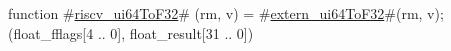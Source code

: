 function #\hyperref[sailRISCVzriscvzyui64ToF32]{riscv\_ui64ToF32}# (rm, v) = {
  #\hyperref[sailRISCVzexternzyui64ToF32]{extern\_ui64ToF32}#(rm, v);
  (float_fflags[4 .. 0], float_result[31 .. 0])
}
